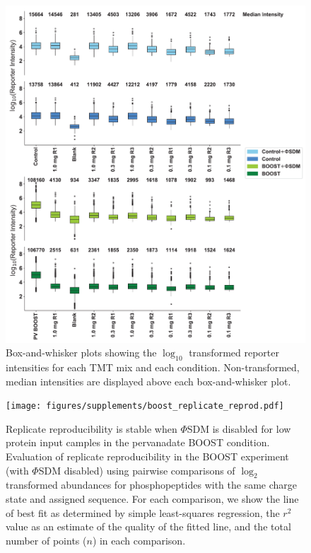 \documentclass[journal=jprobs,manuscript=article]{achemso}
\begin{document}
\begin{figure}
\centering
\includegraphics[width=150mm]{figures/supplements/intensity_plots.pdf}
\caption{Box-and-whisker plots showing the $\log_{10}$ transformed reporter intensities for each TMT mix and each condition. Non-transformed, median intensities are displayed above each box-and-whisker plot.}\label{intensity_plots}
\end{figure}

\clearpage

\begin{figure}[!t]
\centering
\texttt{[image: figures/supplements/boost\_replicate\_reprod.pdf]}
\caption{Replicate reproducibility is stable when $\Phi$SDM is disabled for low protein input camples in the pervanadate BOOST condition. Evaluation of replicate reproducibility in the BOOST experiment (with $\Phi$SDM disabled) using pairwise comparisons of $\log_2$ transformed abundances for phosphopeptides with the same charge state and assigned sequence. For each comparison, we show the line of best fit as determined by simple least-squares regression, the $r^2$ value as an estimate of the quality of the fitted line, and the total number of points ($n$) in each comparison.}\label{boost_replicate_reprod}
\end{figure}
\end{document}
